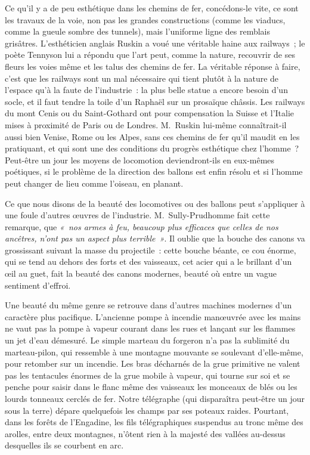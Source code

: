 \documentclass[french,twoside]{book} %
\begin{document}
Ce qu’il y a de peu esthétique dans les chemins de fer, concédons-le vite, ce sont les travaux de la voie, non pas les grandes constructions (comme les viaducs, comme la gueule sombre des tunnels), mais l’uniforme ligne des remblais grisâtres. L’esthéticien anglais Ruskin a voué une véritable haine aux railways ; le poète Tennyson lui a répondu que l’art peut, comme la nature, recouvrir de ses fleurs les voies même et les talus des chemins de fer. La véritable réponse à faire, c’est que les railways sont un mal nécessaire qui tient plutôt à la nature de l’espace qu’à la faute de l’industrie : la plus belle statue a encore besoin d’un socle, et il faut tendre la toile d’un Raphaël sur un prosaïque châssis. Les railways du mont Cenis ou du Saint-Gothard ont pour compensation la Suisse et l’Italie mises à proximité de Paris ou de Londres. M. Ruskin lui-même connaîtrait-il aussi bien Venise, Rome ou les Alpes, sans ces chemins de fer qu’il maudit en les pratiquant, et qui sont une des conditions du progrès esthétique chez l’homme ? Peut-être un jour les moyens de locomotion deviendront-ils en eux-mêmes poétiques, si le problème de la direction des ballons est enfin résolu et si l’homme peut changer de lieu comme l’oiseau, en planant.\par
Ce que nous disons de la beauté des locomotives ou des ballons peut s’appliquer à une foule d’autres œuvres de l’industrie. M. Sully-Prudhomme fait cette remarque, que \emph{« nos armes à feu, beaucoup plus efficaces que celles de nos ancêtres, n’ont pas un aspect plus terrible »}. Il oublie que la  bouche des canons va grossissant suivant la masse du projectile : cette bouche béante, ce cou énorme, qui se tend au dehors des forts et des vaisseaux, cet acier qui a le brillant d’un œil au guet, fait la beauté des canons modernes, beauté où entre un vague sentiment d’effroi.\par
Une beauté du même genre se retrouve dans d’autres machines modernes d’un caractère plus pacifique. L’ancienne pompe à incendie manœuvrée avec les mains ne vaut pas la pompe à vapeur courant dans les rues et lançant sur les flammes un jet d’eau démesuré. Le simple marteau du forgeron n’a pas la sublimité du marteau-pilon, qui ressemble à une montagne mouvante se soulevant d’elle-même, pour retomber sur un incendie. Les bras décharnés de la grue primitive ne valent pas les tentacules énormes de la grue mobile à vapeur, qui tourne sur soi et se penche pour saisir dans le flanc même des vaisseaux les monceaux de blés ou les lourds tonneaux cerclés de fer. Notre télégraphe (qui disparaîtra peut-être un jour sous la terre) dépare quelquefois les champs par ses poteaux raides. Pourtant, dans les forêts de l’Engadine, les fils télégraphiques suspendus au tronc même des arolles, entre deux montagnes, n’ôtent rien à la majesté des vallées au-dessus desquelles ils se courbent en arc.\par
\end{document}
